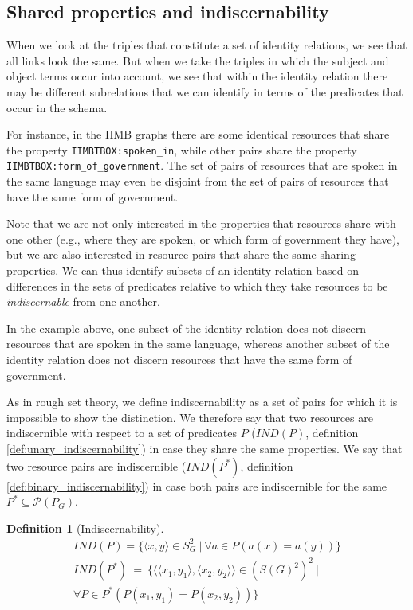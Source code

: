 \documentclass[letterpaper]{article}
\newtheorem{definition}{Definition}
\begin{document}
\subsection{Shared properties and indiscernability}
\label{sec:indiscernibility}

When we look at the triples that constitute a set of identity relations, we see that all links look the same. But when we take the triples in which the subject and object terms occur into account, we see that within the identity relation there may be different subrelations that we can identify in terms of the predicates that occur in the schema.

For instance, in the IIMB graphs there are some identical resources that share the property \verb|IIMBTBOX:spoken_in|, while other pairs share the property \verb|IIMBTBOX:form_of_government|. The set of pairs of resources that are spoken in the same language may even be disjoint from the set of pairs of resources that have the same form of government.

Note that we are not only interested in the properties that resources share with one other (e.g., where they are spoken, or which form of government they have), but we are also interested in resource pairs that share the same sharing properties. We can thus identify subsets of an identity relation based on differences in the sets of predicates relative to which they take resources to be \emph{indiscernable} from one another.

In the example above, one subset of the identity relation does not discern resources that are spoken in the same language, whereas another subset of the identity relation does not discern resources that have the same form of government.

As in rough set theory, we define indiscernability as a set of pairs for which it is impossible to show the distinction. We therefore say that two resources are indiscernible with respect to a set of predicates $P$ ($IND(P)$, definition \ref{def:unary_indiscernability}) in case they share the same properties. We say that two resource pairs are indiscernible ($IND(P^*)$, definition \ref{def:binary_indiscernability}) in case both pairs are indiscernible for the same $P^* \subseteq \mathcal{P}(P_G)$.

\begin{definition}[Indiscernability]
\begin{align}
IND(P) = \{
  \langle x, y \rangle \in S_G^2
\  \vert \ 
  \forall a \in P(a(x) = a(y))
\}
\label{def:unary_indiscernability}
\\
IND(P^*) \  = \  \{
    \langle
      \langle x_1, y_1 \rangle,
      \langle x_2, y_2 \rangle
    \rangle \in (S(G)^2)^2
  \  \vert \ 
\nonumber
\\
    \forall P \in P^*(P(x_1, y_1) = P(x_2, y_2))
  \}
\label{def:binary_indiscernability}
\end{align}
\end{definition}
\end{document}
